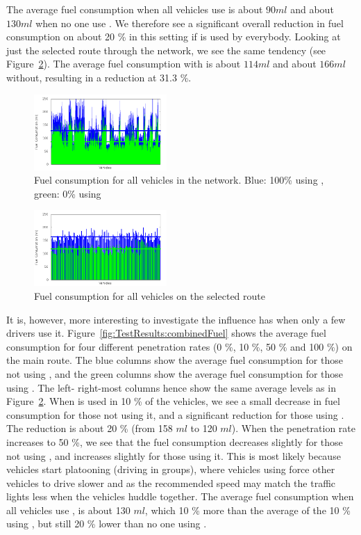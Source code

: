 The average fuel consumption when all vehicles use \tech is about $90 ml$ and about $130 ml$ when no one use \tech.
We therefore see a significant overall reduction in fuel consumption on about 20 \% in this setting if \tech is used by everybody.
Looking at just the selected route through the network, we see the same tendency (see Figure~\ref{fig:TestResults:fuelRoute}). 
The average fuel consumption with \tech is about $114 ml$ and about $166 ml$ without, resulting in a reduction at 31.3 \%.
\begin{figure}[htb]
\includegraphics[width=0.45\textwidth]{../images/tp0c1_0/fuelTotal.png}
\caption{Fuel consumption for all vehicles in the network. Blue: 100\% using \tech, green: 0\% using \tech}
\label{fig:TestResults:fuelTotal}
\end{figure}

\begin{figure}[htb]
\includegraphics[width=0.45\textwidth]{../images/tp0c1_0/fuelRoute.png}
\caption{Fuel consumption for all vehicles on the selected route}
\label{fig:TestResults:fuelRoute}
\end{figure}

It is, however, more interesting to investigate the influence \tech has when only a few drivers use it.
Figure~\ref{fig:TestResults:combinedFuel} shows the average fuel consumption for four different penetration rates (0 \%, 10 \%, 50 \% and 100 \%) on the main route.
The blue columns show the average fuel consumption for those not using \tech, and the green columns show the average fuel consumption for those using \tech.
The left- right-most columns hence show the same average levels as in Figure~\ref{fig:TestResults:fuelRoute}.
When \tech is used in 10 \% of the vehicles, we see a small decrease in fuel consumption for those not using it, and a significant reduction for those using \tech.
The reduction is about 20 \% (from 158 $ml$ to 120 $ml$).
When the penetration rate increases to 50 \%, we see that the fuel consumption decreases slightly for those not using \tech, and increases slightly for those using it.
This is most likely because vehicles start platooning (driving in groups), where vehicles using \tech force other vehicles to drive slower and as the recommended speed may match the traffic lights less when the vehicles huddle together.
The average fuel consumption when all vehicles use \tech, is about 130 $ml$, which 10 \% more than the average of the 10 \% using \tech, but still 20 \% lower than no one using \tech.

